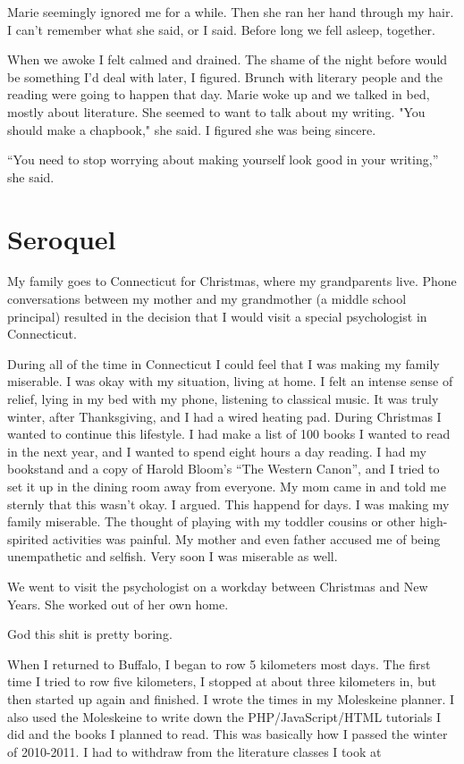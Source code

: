 \documentclass[12pt]{article}
\begin{document}
Marie seemingly ignored me for a while. Then she ran her hand through my hair.
I can't remember what she said, or I said.  Before long we fell asleep,
together.

When we awoke I felt calmed and drained.  The shame of the night before would be
something I'd deal with later, I figured.  Brunch with literary people and the
reading were going to happen that day.  Marie woke up and we talked in bed,
mostly about literature.  She seemed to want to talk about my writing.  "You
should make a chapbook," she said.  I figured she was being sincere.  

``You need to stop worrying about making yourself look good in your writing,'' she
said.

\section{Seroquel}
My family goes to Connecticut for Christmas, where my grandparents live.  Phone
conversations between my mother and my grandmother (a middle school principal)
resulted in the decision that I would visit a special psychologist in
Connecticut.

During all of the time in Connecticut I could feel that I was making my family
miserable.  I was okay with my situation, living at home.  I felt an intense
sense of relief, lying in my bed with my phone, listening to classical music.
It was truly winter, after Thanksgiving, and I had a wired heating pad.  During
Christmas I wanted to continue this lifestyle.  I had make a list of 100 books I
wanted to read in the next year, and I wanted to spend eight hours a day
reading.  I had my bookstand and a copy of Harold Bloom's ``The Western Canon'',
and I tried to set it up in the dining room away from everyone.  My mom came in
and told me sternly that this wasn't okay.  I argued.  This happend for days.  I
was making my family miserable.  The thought of playing with my toddler cousins
or other high-spirited activities was painful.  My mother and even father
accused me of being unempathetic and selfish.  Very soon I was miserable as
well.

We went to visit the psychologist on a workday between Christmas and New
Years.  She worked out of her own home. 

God this shit is pretty boring.

When I returned to Buffalo, I began to row 5 kilometers most days.  The first
time I tried to row five kilometers, I stopped at about three kilometers in, but
then started up again and finished.  I wrote the times in my Moleskeine planner.
I also used the Moleskeine to write down the PHP/JavaScript/HTML tutorials I did
and the books I planned to read.  This was basically how I passed the winter of
2010-2011.  I had to withdraw from the literature classes I took at 
\end{document}
